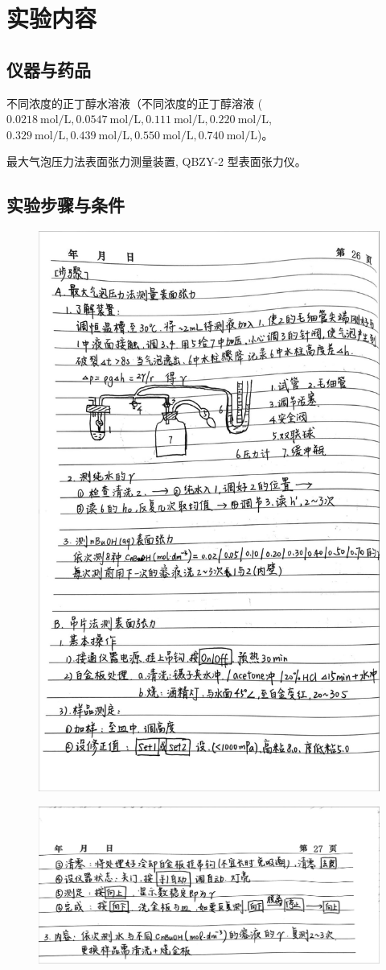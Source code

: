 \section{实验内容\cite{pcl2002}}

\subsection{仪器与药品}

不同浓度的正丁醇水溶液（不同浓度的正丁醇溶液 ($0.0218 \mathrm{~mol} / \mathrm{L}, 0.0547 \mathrm{~mol} / \mathrm{L}, 0.111 \mathrm{~mol} / \mathrm{L}, 0.220 \mathrm{~mol} / \mathrm{L}$, $0.329 \mathrm{~mol} / \mathrm{L}, 0.439 \mathrm{~mol} / \mathrm{L}, 0.550 \mathrm{~mol} / \mathrm{L}, 0.740 \mathrm{~mol} / \mathrm{L}$)。

最大气泡压力法表面张力测量装置, QBZY-2 型表面张力仪。

\subsection{实验步骤与条件}

\begin{figure}[H]
    \centering
    \includegraphics[width=.7\textwidth]{figures/0-3.jpg}
\end{figure}

\begin{figure}[H]
    \centering
    \includegraphics[width=.7\textwidth]{figures/0-4.jpg}
\end{figure}

